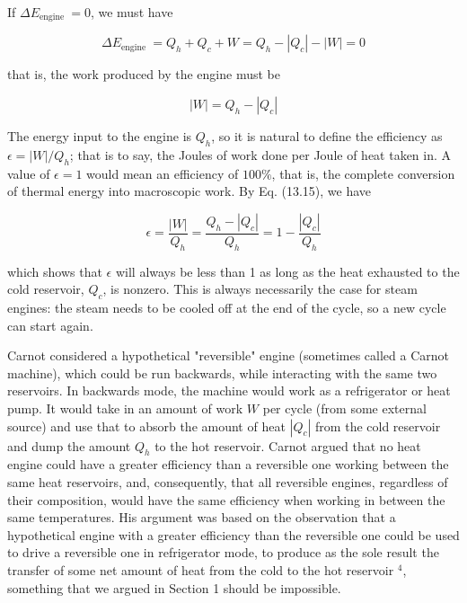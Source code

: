 \documentclass[10pt]{article}
\begin{document}
If $\Delta E_{\text {engine }}=0$, we must have


\begin{equation*}
\Delta E_{\text {engine }}=Q_{h}+Q_{c}+W=Q_{h}-\left|Q_{c}\right|-|W|=0 \tag{13.14}
\end{equation*}


that is, the work produced by the engine must be


\begin{equation*}
|W|=Q_{h}-\left|Q_{c}\right| \tag{13.15}
\end{equation*}


The energy input to the engine is $Q_{h}$, so it is natural to define the efficiency as $\epsilon=|W| / Q_{h}$; that is to say, the Joules of work done per Joule of heat taken in. A value of $\epsilon=1$ would mean an efficiency of $100 \%$, that is, the complete conversion of thermal energy into macroscopic work. By Eq. (13.15), we have


\begin{equation*}
\epsilon=\frac{|W|}{Q_{h}}=\frac{Q_{h}-\left|Q_{c}\right|}{Q_{h}}=1-\frac{\left|Q_{c}\right|}{Q_{h}} \tag{13.16}
\end{equation*}


which shows that $\epsilon$ will always be less than 1 as long as the heat exhausted to the cold reservoir, $Q_{c}$, is nonzero. This is always necessarily the case for steam engines: the steam needs to be cooled off at the end of the cycle, so a new cycle can start again.

Carnot considered a hypothetical "reversible" engine (sometimes called a Carnot machine), which could be run backwards, while interacting with the same two reservoirs. In backwards mode, the machine would work as a refrigerator or heat pump. It would take in an amount of work $W$ per cycle (from some external source) and use that to absorb the amount of heat $\left|Q_{c}\right|$ from the cold reservoir and dump the amount $Q_{h}$ to the hot reservoir. Carnot argued that no heat engine could have a greater efficiency than a reversible one working between the same heat reservoirs, and, consequently, that all reversible engines, regardless of their composition, would have the same efficiency when working in between the same temperatures. His argument was based on the observation that a hypothetical engine with a greater efficiency than the reversible one could be used to drive a reversible one in refrigerator mode, to produce as the sole result the transfer of some net amount of heat from the cold to the hot reservoir ${ }^{4}$, something that we argued in Section 1 should be impossible.
\end{document}
